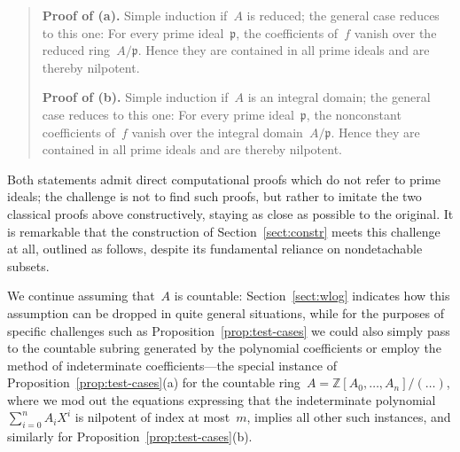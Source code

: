 \documentclass[com,11pt,crcready]{iosart2x}
\theoremstyle{definition}
\theoremstyle{plain}
\theoremstyle{remark}
\newcommand{\ppp}{\mathfrak{p}}
\newcommand{\ZZ}{\mathbb{Z}}
\renewcommand{\_}{\mathpunct{.}\,}
\begin{document}
\begin{quote}\small
  \textbf{Proof of (a).} Simple induction if~$A$ is
  reduced; the general case reduces to this one: For every prime ideal~$\ppp$,
  the coefficients of~$f$ vanish over the reduced ring~$A/\ppp$. Hence they are
  contained in all prime ideals and are thereby
  nilpotent.\medskip

  \textbf{Proof of (b).} Simple induction if~$A$ is an
  integral domain; the general case reduces to this one: For every prime
  ideal~$\ppp$, the nonconstant coefficients of~$f$ vanish over the integral
  domain~$A/\ppp$. Hence they are contained in all prime ideals
  and are thereby nilpotent.
\end{quote}

Both statements admit direct computational proofs which do not
refer to prime ideals; the challenge is not to find such proofs, but rather to
imitate the two classical proofs above constructively, staying as close as
possible to the original. It is remarkable that the construction of
Section~\ref{sect:constr} meets this challenge at all, outlined as follows, despite its fundamental
reliance on nondetachable subsets.

We continue assuming that~$A$ is countable:
Section~\ref{sect:wlog} indicates how this assumption can be dropped in quite
general situations, while for the purposes of specific challenges such as Proposition~\ref{prop:test-cases} we could also
simply pass to the countable subring generated by the polynomial coefficients
or employ the method of indeterminate coefficients---the special instance of
Proposition~\ref{prop:test-cases}(a) for the countable ring~$A =
\ZZ[A_0,\ldots,A_n]/(\ldots)$, where we mod out the equations expressing that
the indeterminate polynomial~$\sum_{i=0}^n A_i X^i$ is nilpotent of
index at most~$m$, implies all other such instances, and similarly for
Proposition~\ref{prop:test-cases}(b).
\end{document}
